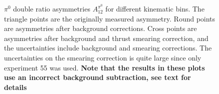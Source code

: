 \begin{figure}[t]
  \caption[$\pi^0$ double ratio asymmetries $A^{\pi^0}_{12}$ after background and thrust-smearing corrections for different kinematic bins]{$\pi^0$ double ratio asymmetries $A^{\pi^0}_{12}$ for different kinematic bins. The triangle points are the originally measured asymmetry. Round points are asymmetries after background corrections. Cross points are asymmetries after background and thrust smearing correction, and the uncertainties include background and smearing corrections. The uncertainties on the smearing correction is quite large since only experiment 55 was used. {\bf Note that the results in these plots use an incorrect background subtraction, see text for details}}
  \label{fig:pi0result}
\end{figure}

\begin{figure}[h]
  \centering     \tiny

\end{figure}
